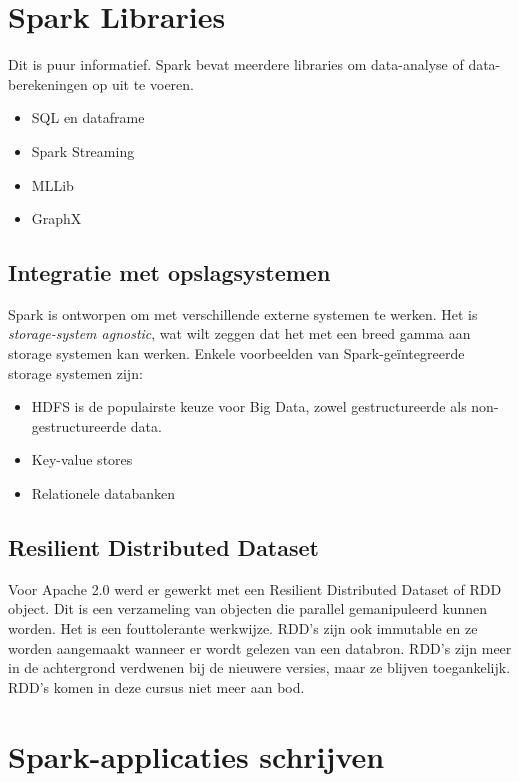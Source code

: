 \documentclass[a4paper,10pt,twoside]{report}
\begin{document}
\section{Spark Libraries}

Dit is puur informatief. Spark bevat meerdere libraries om data-analyse of data-berekeningen op uit te voeren.

\begin{itemize}
	\item SQL en dataframe
	\item Spark Streaming
	\item MLLib
	\item GraphX
\end{itemize}

\subsection{Integratie met opslagsystemen}

Spark is ontworpen om met verschillende externe systemen te werken. Het is \textit{storage-system agnostic}, wat wilt zeggen dat het met een breed gamma aan storage systemen kan werken. Enkele voorbeelden van Spark-geïntegreerde storage systemen zijn:

\begin{itemize}
	\item HDFS is de populairste keuze voor Big Data, zowel gestructureerde als non-gestructureerde data.
	\item Key-value stores
	\item Relationele databanken
\end{itemize} 

\subsection{Resilient Distributed Dataset}

Voor Apache 2.0 werd er gewerkt met een Resilient Distributed Dataset of RDD object. Dit is een verzameling van objecten die parallel gemanipuleerd kunnen worden. Het is een fouttolerante werkwijze. RDD's zijn ook immutable en ze worden aangemaakt wanneer er wordt gelezen van een databron. RDD's zijn meer in de achtergrond verdwenen bij de nieuwere versies, maar ze blijven toegankelijk. RDD's komen in deze cursus niet meer aan bod.

\section{Spark-applicaties schrijven}
\end{document}
